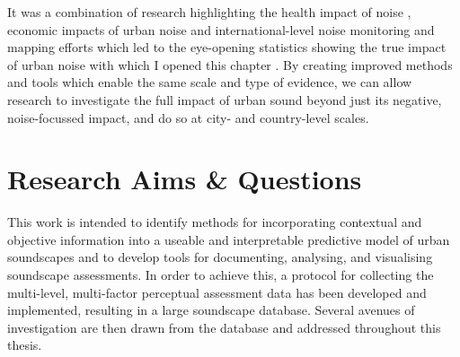 It was a combination of research highlighting the health impact of noise \citep{Ising2004Health}, economic impacts of urban noise \citep{Bristow2014International,Galilea2005Valuing} and international-level noise monitoring and mapping efforts which led to the eye-opening statistics showing the true impact of urban noise with which I opened this chapter \citep{EEA2020Environmental}. By creating improved methods and tools which enable the same scale and type of evidence, we can allow research to investigate the full impact of urban sound beyond just its negative, noise-focussed impact, and do so at city- and country-level scales.





\section{Research Aims \& Questions}
This work is intended to identify methods for incorporating contextual and objective information into a useable and interpretable predictive model of urban soundscapes and to develop tools for documenting, analysing, and visualising soundscape assessments. In order to achieve this, a protocol for collecting the multi-level, multi-factor perceptual assessment data has been developed and implemented, resulting in a large soundscape database. Several avenues of investigation are then drawn from the database and addressed throughout this thesis.

